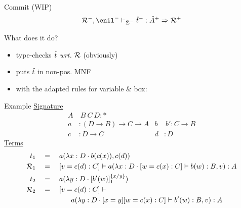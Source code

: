 \documentclass[ignorenonframetext,red]{beamer}
\begin{document}
\begin{frame}{\textsf{Commit} (WIP)}
  \inXLF
  {\Large \[ \jindex{\msi^-}{\pair{\mr^-}{\enil^-}}{\typ{\mo^-}{\mf^+}} \To{\mr^+} \]}
  \begin{block}{What does it do?}
    \begin{itemize}
    \item type-checks $\mo$ \emph{wrt.} $\mr$ (obviously)
    \item puts $\mo$ in non-pos. \textsf{MNF}
    \item with the adapted rules for variable \& box:
      \small
      \begin{mathpar}

      \end{mathpar}
    \end{itemize}
  \end{block}
\end{frame}

\begin{frame}{Example}
  \underline{Signature}
  \begin{align*}
    A&\ B\ C\ D : * \\
    a &: (D\to B)\to C\to A     & b&\ b' : C\to B \\
    c &: D\to C                 & d &: D
  \end{align*}
  \underline{Terms}
  \begin{align*}
    t_1\quad&=\quad
    \lapp a {\lcons{\lam x D \lapp b {\lapp c x}}{\lapp c d}} \\
    \mr_1\quad&=\quad
    \sent v {\lapp c d : C} \vdash \lapp a {\lcons{\lam x D
        \sent w {\lapp c x : C}\vdash \lapp b w : B}{v}} : A \\
    t_2 \quad&=\quad
    \lapp a {\lam y D {\ibox {\lapp{b'} w} 1 x y}} \\
    \mr_2\quad&=\quad
    \sent v {\lapp c d : C} \vdash \\ &\qquad\qquad \lapp a {\lcons{\lam y D
        \sent x y \sent w {\lapp c x : C}\vdash \lapp {b'} w : B}{v}} : A
  \end{align*}
\end{frame}
\end{document}
